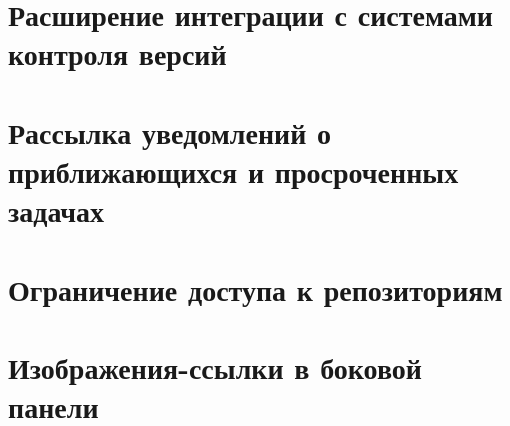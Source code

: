 \section{Расширение интеграции с системами контроля версий}

\section{Рассылка уведомлений о приближающихся и просроченных задачах}

\section{Ограничение доступа к репозиториям}

\section{Изображения-ссылки в боковой панели}



